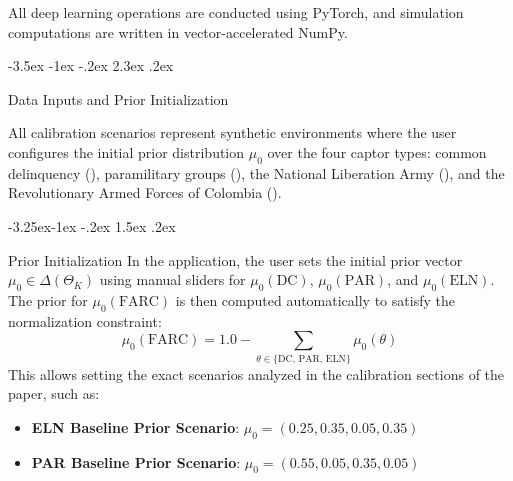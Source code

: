 \documentclass[12pt]{article}
\makeatletter
\numberwithin{equation}{section}
\numberwithin{table}{section}
\renewcommand\section{\@startsection {section}{1}{\z@}%
                                   {-3.5ex \@plus -1ex \@minus -.2ex}%
                                   {2.3ex \@plus.2ex}%
                                   {\normalfont\Large\bfseries\raggedright}}
\renewcommand\subsection{\@startsection{subsection}{2}{\z@}%
                                     {-3.25ex\@plus -1ex \@minus -.2ex}%
                                     {1.5ex \@plus .2ex}%
                                     {\normalfont\large\bfseries\raggedright}}
\makeatother
\begin{document}
All deep learning operations are conducted using PyTorch, and simulation computations are written in vector-accelerated NumPy.

\section{Data Inputs and Prior Initialization}

All calibration scenarios represent synthetic environments where the user configures the initial prior distribution $\mu_0$ over the four captor types: common delinquency (), paramilitary groups (), the National Liberation Army (), and the Revolutionary Armed Forces of Colombia ().

\subsection{Prior Initialization}
In the application, the user sets the initial prior vector $\mu_0 \in \Delta(\Theta_K)$ using manual sliders for $\mu_0(\text{DC})$, $\mu_0(\text{PAR})$, and $\mu_0(\text{ELN})$. The prior for $\mu_0(\text{FARC})$ is then computed automatically to satisfy the normalization constraint:
\begin{equation}
\mu_0(\text{FARC}) = 1.0 - \sum_{\theta \in \{\text{DC},\,\text{PAR},\,\text{ELN}\}} \mu_0(\theta)
\end{equation}
This allows setting the exact scenarios analyzed in the calibration sections of the paper, such as:
\begin{itemize}
    \item \textbf{ELN Baseline Prior Scenario}: $\mu_0 = (0.25, 0.35, 0.05, 0.35)$
    \item \textbf{PAR Baseline Prior Scenario}: $\mu_0 = (0.55, 0.05, 0.35, 0.05)$
\end{itemize}
\end{document}
